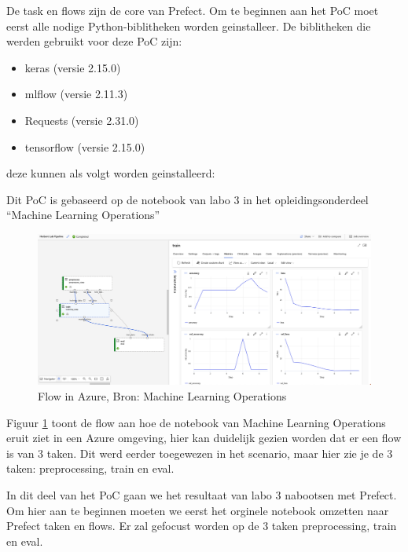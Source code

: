 De task en flows zijn de core van Prefect. Om te beginnen aan het PoC moet eerst alle nodige Python-biblitheken worden geinstalleer.
De biblitheken die werden gebruikt voor deze PoC zijn:
\begin{itemize}
    \item keras (versie 2.15.0)
    \item mlflow (versie 2.11.3)
    \item Requests (versie 2.31.0)
    \item tensorflow (versie 2.15.0)
\end{itemize}

deze kunnen als volgt worden geinstalleerd: 


Dit PoC is gebaseerd op de notebook van labo 3 in het opleidingsonderdeel ``Machine Learning Operations''

\begin{figure}[h]
    \includegraphics[width=\linewidth]{download.png}
    \caption{Flow in Azure, Bron: Machine Learning Operations}
    \label{fig:Resultaten in Azure}
\end{figure}

Figuur \ref{fig:Resultaten in Azure} toont de flow aan hoe de notebook van Machine Learning Operations eruit ziet in een Azure omgeving, hier kan duidelijk gezien worden dat er een flow is van 3 taken.
Dit werd eerder toegewezen in het scenario, maar hier zie je de 3 taken: preprocessing, train en eval.

In dit deel van het PoC gaan we het resultaat van labo 3 nabootsen met Prefect.
Om hier aan te beginnen moeten we eerst het orginele notebook omzetten naar Prefect taken en flows. Er zal gefocust worden op de 3 taken preprocessing, train en eval.

